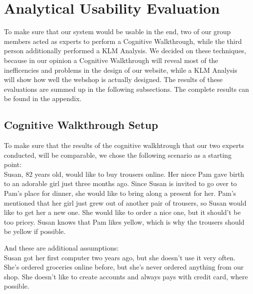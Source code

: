 \section{Analytical Usability Evaluation}
To make sure that our system would be usable in the end, two of our group members acted as experts to perform a Cognitive Walkthrough, while the third person additionally performed a KLM Analysis. We decided on these techniques, because in our opinion a Cognitive Walkthrough will reveal most of the inefficencies and problems in the design of our website, while a KLM Analysis will show how well the webshop is actually designed.
The results of these evaluations are summed up in the following subsections. The complete results can be found in the appendix.

\subsection{Cognitive Walkthrough Setup}
To make sure that the results of the cognitive walkhtrough that our two experts conducted, will be comparable, we chose the following scenario as a starting point:\\

Susan, 82 years old, would like to buy trousers online. Her niece Pam gave birth to an adorable girl just three months ago. Since Susan is invited to go over to Pam's place for dinner, she would like to bring along a present for her. Pam's mentioned that her girl just grew out of another pair of trousers, so Susan would like to get her a new one. She would like to order a nice one, but it should't be too pricey. Susan knows that Pam likes yellow, which is why the trousers should be yellow if possible.

And these are additional assumptions:\\
Susan got her first computer two years ago, but she doesn't use it very often. She's ordered groceries online before, but she's never ordered anything from our shop. She doesn't like to create accounts and always pays with credit card, where possible.

